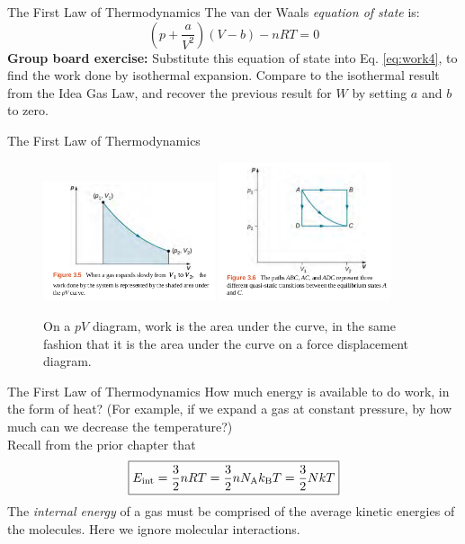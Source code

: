 \documentclass{beamer}
\begin{document}
\begin{frame}{The First Law of Thermodynamics}
The van der Waals \textit{equation of state} is: 
\begin{equation}
\left(p+\frac{a}{V^2}\right)\left(V-b\right) - nRT = 0
\label{eq:vanDerWaals}
\end{equation}
\textbf{Group board exercise:} Substitute this equation of state into Eq. \ref{eq:work4}, to find the work done by isothermal expansion.  Compare to the isothermal result from the Idea Gas Law, and recover the previous result for $W$ by setting $a$ and $b$ to zero.
\end{frame}

\begin{frame}{The First Law of Thermodynamics}
\begin{figure}
\centering
\includegraphics[width=0.45\textwidth]{figures/area1.png}
\includegraphics[width=0.45\textwidth]{figures/area2.png}
\caption{\label{fig:area} \small On a $pV$ diagram, work is the area under the curve, in the same fashion that it is the area under the curve on a force displacement diagram.}
\end{figure}
\end{frame}

\begin{frame}{The First Law of Thermodynamics}
How much energy is available to do work, in the form of heat?  (For example, if we expand a gas at constant pressure, by how much can we decrease the temperature?) \\ \vspace{0.5cm}
Recall from the prior chapter that 
\begin{equation}
\boxed{
E_{\rm int} = \frac{3}{2}nRT = \frac{3}{2}nN_{\rm A}k_{\rm B}T = \frac{3}{2}NkT}
\label{eq:internal}
\end{equation}
The \textit{internal energy} of a gas must be comprised of the average kinetic energies of the molecules.  Here we ignore molecular interactions.
\end{frame}
\end{document}
